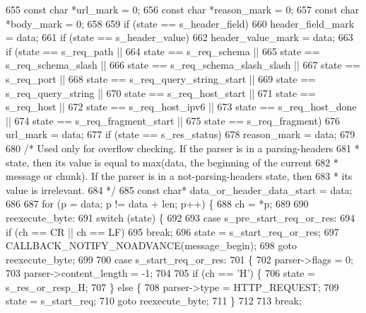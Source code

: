 \begin{DoxyCode}
655   \textcolor{keyword}{const} \textcolor{keywordtype}{char} *url\_mark = 0;
656   \textcolor{keyword}{const} \textcolor{keywordtype}{char} *reason\_mark = 0;
657   \textcolor{keyword}{const} \textcolor{keywordtype}{char} *body\_mark = 0;
658 
659   \textcolor{keywordflow}{if} (state == s_header_field)
660     header\_field\_mark = data;
661   \textcolor{keywordflow}{if} (state == s_header_value)
662     header\_value\_mark = data;
663   \textcolor{keywordflow}{if} (state == s_req_path ||
664       state == s_req_schema ||
665       state == s_req_schema_slash ||
666       state == s_req_schema_slash_slash ||
667       state == s_req_port ||
668       state == s_req_query_string_start ||
669       state == s_req_query_string ||
670       state == s_req_host_start ||
671       state == s_req_host ||
672       state == s_req_host_ipv6 ||
673       state == s_req_host_done ||
674       state == s_req_fragment_start ||
675       state == s_req_fragment)
676     url\_mark = data;
677   \textcolor{keywordflow}{if} (state == s_res_status)
678     reason\_mark = data;
679 
680   \textcolor{comment}{/* Used only for overflow checking. If the parser is in a parsing-headers}
681 \textcolor{comment}{   * state, then its value is equal to max(data, the beginning of the current}
682 \textcolor{comment}{   * message or chunk). If the parser is in a not-parsing-headers state, then}
683 \textcolor{comment}{   * its value is irrelevant.}
684 \textcolor{comment}{   */}
685   \textcolor{keyword}{const} \textcolor{keywordtype}{char}* data\_or\_header\_data\_start = data;
686 
687   \textcolor{keywordflow}{for} (p = data; p != data + len; p++) \{
688     ch = *p;
689 
690     reexecute\_byte:
691     \textcolor{keywordflow}{switch} (state) \{
692 
693       \textcolor{keywordflow}{case} s_pre_start_req_or_res:
694         \textcolor{keywordflow}{if} (ch == CR || ch == LF)
695           \textcolor{keywordflow}{break};
696         state = s_start_req_or_res;
697         CALLBACK_NOTIFY_NOADVANCE(message\_begin);
698         \textcolor{keywordflow}{goto} reexecute\_byte;
699 
700       \textcolor{keywordflow}{case} s_start_req_or_res:
701       \{
702         parser->flags = 0;
703         parser->content_length = -1;
704 
705         \textcolor{keywordflow}{if} (ch == \textcolor{charliteral}{'H'}) \{
706           state = s_res_or_resp_H;
707         \} \textcolor{keywordflow}{else} \{
708           parser->type = HTTP_REQUEST;
709           state = s_start_req;
710           \textcolor{keywordflow}{goto} reexecute\_byte;
711         \}
712 
713         \textcolor{keywordflow}{break};

\end{DoxyCode}
